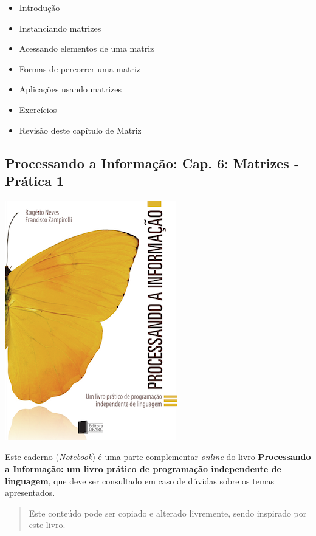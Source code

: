 \documentclass[12pt,a4paper]{article}
\providecommand{\tightlist}{%
      \setlength{\itemsep}{0pt}\setlength{\parskip}{0pt}}
\begin{document}
\begin{itemize}
\tightlist
\item
  Introdução
\item
  Instanciando matrizes
\item
  Acessando elementos de uma matriz
\item
  Formas de percorrer uma matriz
\item
  Aplicações usando matrizes
\item
  Exercícios
\item
  Revisão deste capítulo de Matriz
\end{itemize}

    \hypertarget{processando-a-informauxe7uxe3o-cap.-6-matrizes---pruxe1tica-1}{%
\subsection{Processando a Informação: Cap. 6: Matrizes - Prática
1}\label{processando-a-informauxe7uxe3o-cap.-6-matrizes---pruxe1tica-1}}

    \includegraphics{"figs/Capa_Processando_Informacao.jpg"}

Este caderno (\emph{Notebook}) é uma parte complementar \emph{online} do
livro
\textbf{\href{https://editora.ufabc.edu.br/matematica-e-ciencias-da-computacao/58-processando-a-informacao}{Processando
a Informação}: um livro prático de programação independente de
linguagem}, que deve ser consultado em caso de dúvidas sobre os temas
apresentados.

\begin{quote}
Este conteúdo pode ser copiado e alterado livremente, sendo inspirado
por este livro.
\end{quote}
\end{document}
